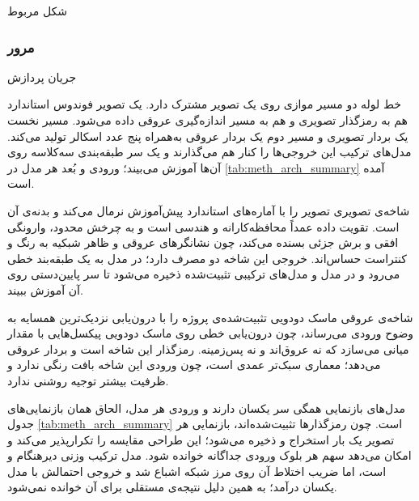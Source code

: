 شکل مربوط\subsubsection{مرور}{جریان پردازش}

خط لوله دو مسیر موازی روی یک تصویر مشترک دارد. یک تصویر فوندوس استاندارد هم به رمزگذار تصویری و هم به مسیر اندازه‌گیری عروقی داده می‌شود. مسیر نخست یک بردار تصویری و مسیر دوم یک بردار عروقی به‌همراه پنج عدد اسکالر تولید می‌کند. مدل‌های ترکیب این خروجی‌ها را کنار هم می‌گذارند و یک سر طبقه‌بندی سه‌کلاسه روی آن‌ها آموزش می‌بیند؛ ورودی و بُعد هر مدل در \autoref{tab:meth_arch_summary} آمده است.

شاخه‌ی تصویری تصویر  را با آماره‌های استاندارد پیش‌آموزش نرمال می‌کند و بدنه‌ی آن  است. تقویت داده عمداً محافظه‌کارانه و هندسی است و به چرخش محدود، وارونگی افقی و برش جزئی بسنده می‌کند، چون نشانگرهای عروقی و ظاهر شبکیه به رنگ و کنتراست حساس‌اند. خروجی این شاخه دو مصرف دارد؛ در مدل  به یک طبقه‌بند خطی می‌رود و در مدل  و مدل‌های ترکیبی تثبیت‌شده ذخیره می‌شود تا سر پایین‌دستی روی آن آموزش ببیند.

شاخه‌ی عروقی ماسک دودویی تثبیت‌شده‌ی پروژه را با درون‌یابی نزدیک‌ترین همسایه به وضوح ورودی می‌رساند، چون درون‌یابی خطی روی ماسک دودویی پیکسل‌هایی با مقدار میانی می‌سازد که نه عروق‌اند و نه پس‌زمینه. رمزگذار این شاخه  است و بردار عروقی می‌دهد؛ معماری سبک‌تر عمدی است، چون ورودی این شاخه بافت رنگی ندارد و ظرفیت بیشتر توجیه روشنی ندارد.

مدل‌های بازنمایی همگی سر  یکسان دارند و ورودی هر مدل، الحاق همان بازنمایی‌های جدول \ref{tab:meth_arch_summary} است. چون رمزگذارها تثبیت‌شده‌اند، بازنمایی هر تصویر یک بار استخراج و ذخیره می‌شود؛ این طراحی مقایسه را تکرارپذیر می‌کند و امکان می‌دهد سهم هر بلوک ورودی جداگانه خوانده شود. مدل  ترکیب وزنی دیرهنگام  و  است، اما ضریب اختلاط آن روی مرز شبکه اشباع شد و خروجی احتمالش با مدل  یکسان درآمد؛ به همین دلیل نتیجه‌ی مستقلی برای آن خوانده نمی‌شود.

